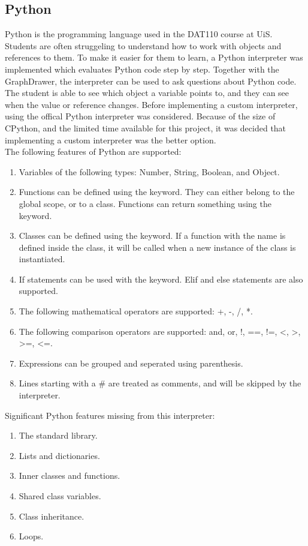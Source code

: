 \subsection{Python}
Python is the programming language used in the DAT110 course at UiS. Students are often struggeling to understand how to work with objects and references to them. To make it easier for them to learn, a Python interpreter was implemented which evaluates Python code step by step. Together with the GraphDrawer, the interpreter can be used to ask questions about Python code. The student is able to see which object a variable points to, and they can see when the value or reference changes. Before implementing a custom interpreter, using the offical Python interpreter was considered. Because of the size of CPython, and the limited time available for this project, it was decided that implementing a custom interpreter was the better option.
\\[11pt]
The following features of Python are supported:
\begin{enumerate}
    \item Variables of the following types: Number, String, Boolean, and Object.
    \item Functions can be defined using the  keyword. They can either belong to the global scope, or to a class. Functions can return something using the  keyword.
    \item Classes can be defined using the  keyword. If a function with the  name is defined inside the class, it will be called when a new instance of the class is instantiated.
    \item If statements can be used with the  keyword. Elif and else statements are also supported.
    \item The following mathematical operators are supported: +, -, /, *.
    \item The following comparison operators are supported: and, or, !, ==, !=, <, >, >=, <=.
    \item Expressions can be grouped and seperated using parenthesis.
    \item Lines starting with a \# are treated as comments, and will be skipped by the interpreter.
\end{enumerate}
Significant Python features missing from this interpreter:
\begin{enumerate}
    \item The standard library.
    \item Lists and dictionaries.
    \item Inner classes and functions.
    \item Shared class variables.
    \item Class inheritance.
    \item Loops.
\end{enumerate}
